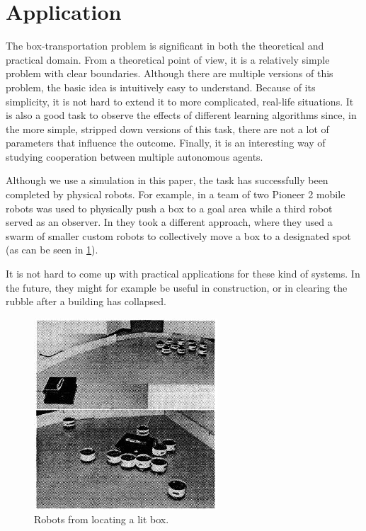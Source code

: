\section{Application}
The box-transportation problem is significant in both the theoretical and practical domain. From a theoretical point of view, it is a relatively simple problem with clear boundaries. Although there are multiple versions of this problem, the basic idea is intuitively easy to understand. Because of its simplicity, it is not hard to extend it to more complicated, real-life situations. It is also a good task to observe the effects of different learning algorithms since, in the more simple, stripped down versions of this task, there are not a lot of parameters that influence the outcome. Finally, it is an interesting way of studying cooperation between multiple autonomous agents.

 Although we use a simulation in this paper, the task has successfully been completed by physical robots. For example, in \cite{mataric2002} a team of two Pioneer 2 mobile robots was used to physically push a box to a goal area while a third robot served as an observer. In \cite{kube1996} they took a different approach, where they used a swarm of smaller custom robots to collectively move a box to a designated spot (as can be seen in \ref{1}).

 It is not hard to come up with practical applications for these kind of systems. In the future, they might for example be useful in construction, or in clearing the rubble after a building has collapsed.
\begin{figure}
	\centering
	\includegraphics{images/swarmPushing.png}
	\caption{Robots from \cite{kube1996} locating a lit box.}
	\label{1}
\end{figure}

